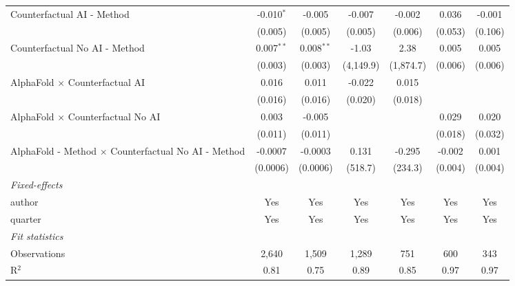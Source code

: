 \begin{tabular}{lcccccc}
   Counterfactual AI - Method                                 & -0.010$^{*}$   & -0.005         & -0.007       & -0.002    & 0.036   & -0.001\\   
                                                              & (0.005)        & (0.005)        & (0.005)      & (0.006)   & (0.053) & (0.106)\\   
   Counterfactual No AI - Method                              & 0.007$^{**}$   & 0.008$^{**}$   & -1.03        & 2.38      & 0.005   & 0.005\\   
                                                              & (0.003)        & (0.003)        & (4,149.9)    & (1,874.7) & (0.006) & (0.006)\\   
   AlphaFold $\times$ Counterfactual AI                       & 0.016          & 0.011          & -0.022       & 0.015     &         &   \\   
                                                              & (0.016)        & (0.016)        & (0.020)      & (0.018)   &         &   \\   
   AlphaFold $\times$ Counterfactual No AI                    & 0.003          & -0.005         &              &           & 0.029   & 0.020\\   
                                                              & (0.011)        & (0.011)        &              &           & (0.018) & (0.032)\\   
   AlphaFold - Method $\times$ Counterfactual No AI - Method  & -0.0007        & -0.0003        & 0.131        & -0.295    & -0.002  & 0.001\\   
                                                              & (0.0006)       & (0.0006)       & (518.7)      & (234.3)   & (0.004) & (0.004)\\   
   \midrule
   \emph{Fixed-effects}\\
   author                                                     & Yes            & Yes            & Yes          & Yes       & Yes     & Yes\\  
   quarter                                                    & Yes            & Yes            & Yes          & Yes       & Yes     & Yes\\  
   \midrule
   \emph{Fit statistics}\\
   Observations                                               & 2,640          & 1,509          & 1,289        & 751       & 600     & 343\\  
   R$^2$                                                      & 0.81           & 0.75           & 0.89         & 0.85      & 0.97    & 0.97\\  

\end{tabular}

